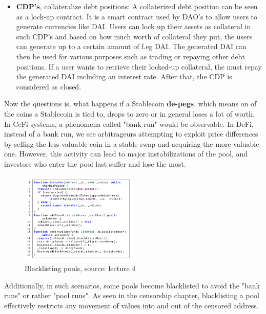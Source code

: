 \documentclass{article}
\begin{document}
\begin{itemize}
\begin{itemize}
\item {\textbf{CDP's}, collateralize debt positions}: A collaterized debt position can be seen as a lock-up contract. It is a smart contract used by DAO's to  allow users to generate currencies like DAI. Users can lock up their assets as collateral in such CDP's and based on how much worth of collateral they put, the users can generate up to a certain amount of f.eg DAI. The generated DAI can then be used for various purposes such as trading or repaying other debt positions. If a user wants to retrieve their locked-up collateral, the must repay the generated DAI including an interest rate. After that, the CDP is considered as closed.
\end{itemize}
\end{itemize}
Now the questions is, what happens if a Stablecoin \textbf{de-pegs}, which means on of the coins a Stablecoin is tied to, drops to zero or in general loses a lot of worth. In CeFi systems, a phenomena called "bank run" would be observable. In DeFi, instead of a bank run, we see arbitrageurs attempting to exploit price differences by selling the less valuable coin in a stable swap and acquiring the more valuable one. However, this activity can lead to major instabilizations of the pool, and investors who enter the pool last suffer and lose the most. \begin{figure}[h]
    \centering
    \includegraphics[width=0.5\textwidth]{Bildschirmfoto 2024-04-02 um 16.33.28.png} %
    \caption{Blacklisting pools, \scriptsize{source: lecture 4}}
    \label{fig:DoS-attack}
\end{figure} Additionally, in such scenarios, some pools become blacklisted to avoid the "bank runs" or rather "pool runs". As seen in the censorship chapter, blacklisting a pool effectively restricts any movement of values into and out of the censored address.
\end{document}
